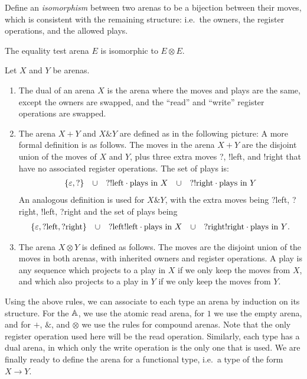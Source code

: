Define an \emph{isomorphism} between two arenas to be a bijection between their moves, which is consistent with the remaining structure: i.e.~the owners, the register operations, and the allowed plays. 

\begin{fact}
    The equality test arena $E$ is isomorphic to $E \otimes E$. 
\end{fact}

\begin{definition}
    Let $X$ and $Y$ be arenas. 
    \begin{enumerate}
        \item The dual of an arena $X$ is the arena where the moves and plays are the same, except the owners are swapped, and the ``read'' and ``write'' register operations are swapped.
        \item The arena $X + Y$ and $X \& Y$ are defined  as in the following picture:
        A more formal definition is as follows. The moves in the arena $X + Y$ are the disjoint union of the moves of $X$ and $Y$, plus  three extra moves ?, !left, and !right that have no associated  register operations. The set of plays is:
        \begin{align*}
        \{\varepsilon, ?\}
        \quad \cup \quad 
        ?  !\text{left}\cdot \text{plays in $X$}
        \quad  \cup \quad 
        ?!\text{right} \cdot \text{plays in $Y$}
        \end{align*}
        An analogous definition is used for $X \& Y$, with the extra moves being ?left, ?right, !left, ?right and the set of plays being 
        \begin{align*}
        \{\varepsilon, ?\text{left}, ?\text{right}\}
        \quad \cup \quad
        ?\text{left} !\text{left} \cdot \text{plays in $X$}
        \quad \cup \quad
        ?\text{right} !\text{right} \cdot \text{plays in $Y$}.
        \end{align*}
        \item The arena $X \otimes Y$ is defined as follows. The moves are the disjoint union of the moves in both arenas, with inherited owners and register operations. A play is any sequence which projects to a play in $X$ if we only keep the moves from $X$, and which also projects to a play in $Y$ if we only keep the moves from $Y$.
    \end{enumerate}
\end{definition}


Using the above rules, we can associate to each type an arena by induction on its structure. For the $\mathbb A$, we use the atomic read arena, for $1$ we use the empty arena, and for $+$, $\&$, and $\otimes$ we use the rules for compound arenas. Note that the only register operation used here will be the read operation. Similarly, each type has a dual arena, in which only the write operation is the only one that is used. We are finally ready to define the arena for a functional type, i.e.~a type of the form $X \to Y$.


